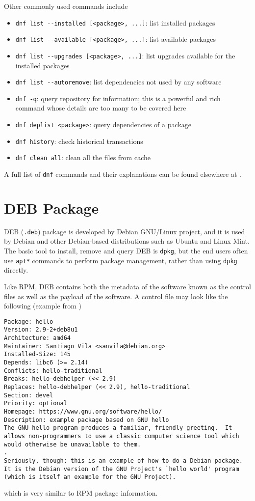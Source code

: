Other commonly used commands include
\begin{itemize}
	\item \verb|dnf list --installed [<package>, ...]|: list installed packages
	\item \verb|dnf list --available [<package>, ...]|: list available packages
	\item \verb|dnf list --upgrades [<package>, ...]|: list upgrades available for the installed packages
	\item \verb|dnf list --autoremove|: list dependencies not used by any software
	\item \verb|dnf -q|: query repository for information; this is a powerful and rich command whose details are too many to be covered here
	\item \verb|dnf deplist <package>|: query dependencies of a package
	\item \verb|dnf history|: check historical transactions
	\item \verb|dnf clean all|: clean all the files from cache
\end{itemize}

A full list of \verb|dnf| commands and their explanations can be found elsewhere at \cite{redhat2024dnf}.

\section{DEB Package}

DEB (\verb|.deb|) package is developed by Debian GNU/Linux project, and it is used by Debian and other Debian-based distributions such as Ubuntu and Linux Mint. The basic tool to install, remove and query DEB is \verb|dpkg|, but the end users often use \verb|apt*| commands to perform package management, rather than using \verb|dpkg| directly.

Like RPM, DEB contains both the metadata of the software known as the control files as well as the payload of the software. A control file may look like the following (example from \cite{debian2024debianpackagemanagement})
\begin{lstlisting}
Package: hello
Version: 2.9-2+deb8u1
Architecture: amd64
Maintainer: Santiago Vila <sanvila@debian.org>
Installed-Size: 145
Depends: libc6 (>= 2.14)
Conflicts: hello-traditional
Breaks: hello-debhelper (<< 2.9)
Replaces: hello-debhelper (<< 2.9), hello-traditional
Section: devel
Priority: optional
Homepage: https://www.gnu.org/software/hello/
Description: example package based on GNU hello
The GNU hello program produces a familiar, friendly greeting.  It
allows non-programmers to use a classic computer science tool which
would otherwise be unavailable to them.
.
Seriously, though: this is an example of how to do a Debian package.
It is the Debian version of the GNU Project's `hello world' program
(which is itself an example for the GNU Project).
\end{lstlisting}
which is very similar to RPM package information.

